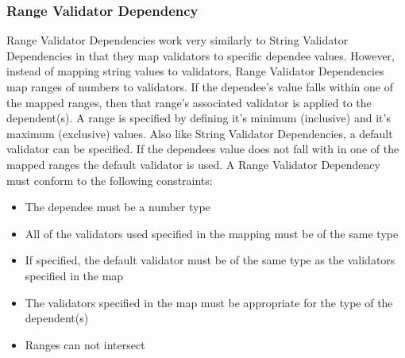 \subsubsection{Range Validator Dependency}
Range Validator Dependencies work very similarly to String Validator Dependencies in that they map validators to specific dependee values. However,
instead of mapping string values to validators, Range Validator Dependencies map ranges of numbers to validators. If the dependee's value falls within one of the 
mapped ranges, then that range's associated validator is applied to the dependent(s). A range is specified by defining it's minimum (inclusive) and it's maximum (exclusive) 
values. Also like String Validator Dependencies, a default validator can be specified. If the dependees value does not fall with in one of the mapped ranges the default 
validator is used. A Range Validator Dependency must conform to the following constraints:
\begin{itemize}
\item The dependee must be a number type
\item All of the validators used specified in the mapping must be of the same type
\item If specified, the default validator must be of the same type as the validators specified in the map
\item The validators specified in the map must be appropriate for the type of the dependent(s)
\item Ranges can not intersect
\end{itemize}

